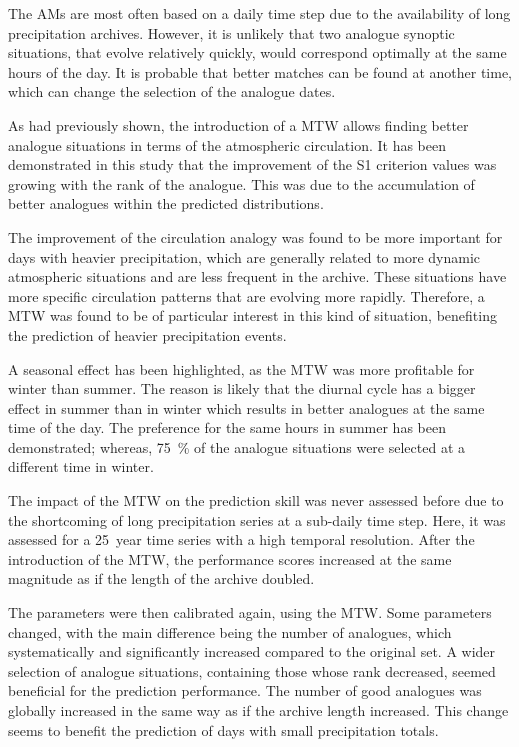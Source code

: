 \documentclass[hess, manuscript]{copernicus}
\begin{document}
	The AMs are most often based on a daily time step due to the availability of long precipitation archives. However, it is unlikely that two analogue synoptic situations, that evolve relatively quickly, would correspond optimally at the same hours of the day. It is probable that better matches can be found at another time, which can change the selection of the analogue dates.
	
	As \citet{Finet2008} had previously shown, the introduction of a MTW allows finding better analogue situations in terms of the atmospheric circulation. It has been demonstrated in this study that the improvement of the S1 criterion values was growing with the rank of the analogue. This was due to the accumulation of better analogues within the predicted distributions.
	
	The improvement of the circulation analogy was found to be more important for days with heavier precipitation, which are generally related to more dynamic atmospheric situations and are less frequent in the archive. These situations have more specific circulation patterns that are evolving more rapidly. Therefore, a MTW was found to be of particular interest in this kind of situation, benefiting the prediction of heavier precipitation events.
	
	A seasonal effect has been highlighted, as the MTW was more profitable for winter than summer. The reason is likely that the diurnal cycle has a bigger effect in summer than in winter which results in better analogues at the same time of the day. The preference for the same hours in summer has been demonstrated; whereas, 75~\% of the analogue situations were selected at a different time in winter.
	
	The impact of the MTW on the prediction skill was never assessed before due to the shortcoming of long precipitation series at a sub-daily time step. Here, it was assessed for a 25~year time series with a high temporal resolution. After the introduction of the MTW, the performance scores increased at the same magnitude as if the length of the archive doubled.
	
	The parameters were then calibrated again, using the MTW. Some parameters changed, with the main difference being the number of analogues, which systematically and significantly increased compared to the original set. A wider selection of analogue situations, containing those whose rank decreased, seemed beneficial for the prediction performance. The number of good analogues was globally increased in the same way as if the archive length increased. This change seems to benefit the prediction of days with small precipitation totals.
	
\end{document}
